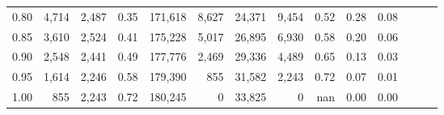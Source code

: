 \begin{tabular}{rrrrrrrrrrrrrr}
0.80 &   4,714 &  2,487 &  0.35 &  171,618 &    8,627 &  24,371 &   9,454 &  0.52 &  0.28 &      0.08 \\
0.85 &   3,610 &  2,524 &  0.41 &  175,228 &    5,017 &  26,895 &   6,930 &  0.58 &  0.20 &      0.06 \\
0.90 &   2,548 &  2,441 &  0.49 &  177,776 &    2,469 &  29,336 &   4,489 &  0.65 &  0.13 &      0.03 \\
0.95 &   1,614 &  2,246 &  0.58 &  179,390 &      855 &  31,582 &   2,243 &  0.72 &  0.07 &      0.01 \\
1.00 &     855 &  2,243 &  0.72 &  180,245 &        0 &  33,825 &       0 &   nan &  0.00 &      0.00 \\
\bottomrule
\end{tabular}
